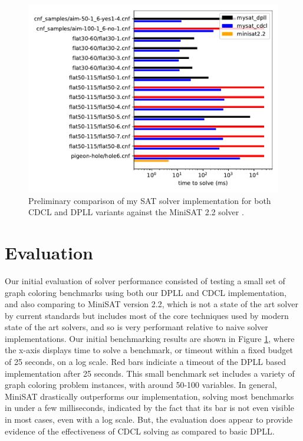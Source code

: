 \documentclass[12pt]{article}
\begin{document}
\begin{figure}
    \begin{center}
        \includegraphics[scale=0.6]{../results/compare.pdf}
    \end{center}
    \label{fig:benchmarks}
    \caption{Preliminary comparison of my SAT solver implementation for both CDCL and DPLL variants against the MiniSAT 2.2 solver \cite{minisat}. }
\end{figure}

\section{Evaluation}

Our initial evaluation of solver performance consisted of testing a small set of graph coloring benchmarks using both our DPLL and CDCL implementation, and also comparing to MiniSAT version 2.2, which is not a state of the art solver by current standards but includes most of the core techniques used by modern state of the art solvers, and so is very performant relative to naive solver implementations. Our initial benchmarking results are shown in Figure \ref{fig:benchmarks}, where the x-axis displays time to solve a benchmark, or timeout within a fixed budget of 25 seconds, on a log scale. Red bars indiciate a timeout of the DPLL based implementation after 25 seconds. This small benchmark set includes a variety of graph coloring problem instances, with around 50-100 variables. In general, MiniSAT drastically outperforms our implementation, solving most benchmarks in under a few milliseconds, indicated by the fact that its bar is not even visible in most cases, even with a log scale. But, the evaluation does appear to provide evidence of the effectiveness of CDCL solving as compared to basic DPLL.
\end{document}
